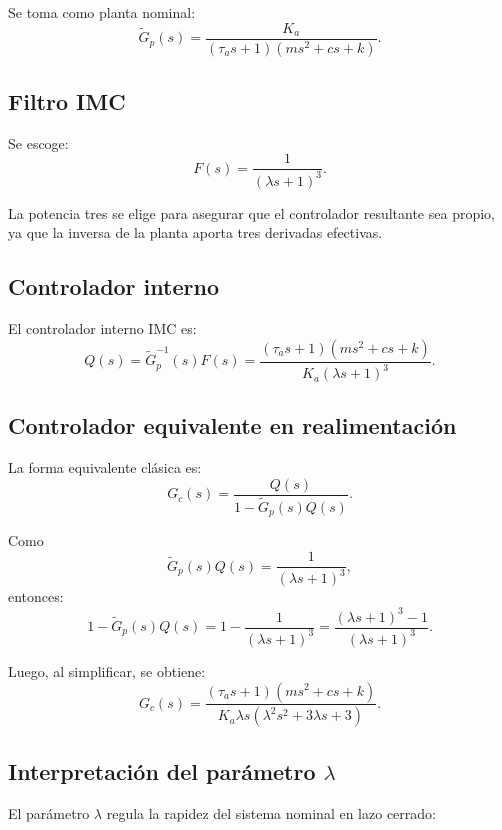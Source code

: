\documentclass[11pt]{article}
\begin{document}
Se toma como planta nominal:
\[
\tilde{G}_p(s)=\frac{K_a}{(\tau_as+1)(ms^2+cs+k)}.
\]

\subsection{Filtro IMC}

Se escoge:
\begin{equation}
F(s)=\frac{1}{(\lambda s+1)^3}.
\label{eq:filtro}
\end{equation}

La potencia tres se elige para asegurar que el controlador resultante sea propio, ya que la inversa de la planta aporta tres derivadas efectivas.

\subsection{Controlador interno}

El controlador interno IMC es:
\begin{equation}
Q(s)=\tilde{G}_p^{-1}(s)F(s)
=
\frac{(\tau_as+1)(ms^2+cs+k)}{K_a(\lambda s+1)^3}.
\label{eq:q}
\end{equation}

\subsection{Controlador equivalente en realimentaci\'on}

La forma equivalente cl\'asica es:
\begin{equation}
G_c(s)=\frac{Q(s)}{1-\tilde{G}_p(s)Q(s)}.
\label{eq:gcdef}
\end{equation}

Como
\[
\tilde{G}_p(s)Q(s)=\frac{1}{(\lambda s+1)^3},
\]
entonces:
\[
1-\tilde{G}_p(s)Q(s)=1-\frac{1}{(\lambda s+1)^3}
=\frac{(\lambda s+1)^3-1}{(\lambda s+1)^3}.
\]

Luego, al simplificar, se obtiene:
\begin{equation}
G_c(s)=
\frac{(\tau_as+1)(ms^2+cs+k)}
{K_a\lambda s(\lambda^2s^2+3\lambda s+3)}.
\label{eq:gc}
\end{equation}

\subsection{Interpretaci\'on del par\'ametro $\lambda$}

El par\'ametro $\lambda$ regula la rapidez del sistema nominal en lazo cerrado:
\end{document}
